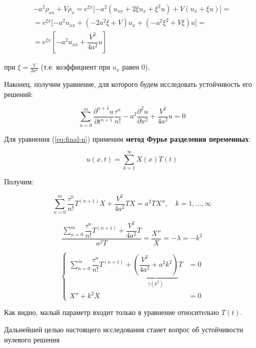 \begin{align}
- a^2 \rho_{xx} + V \rho_x = e^{\xi x} \lbrack -a^2 (u_{xx} + 2 \xi u_x + \xi^2 u) + V (u_x + \xi u) \rbrack = \\
= e^{\xi x} \lbrack -a^2 u_{xx} + (-2 a^2 \xi + V) u_x + (-a^2 \xi^2 + V \xi) u \rbrack = \\
= e^{\xi x} \left\lbrack -a^2 u_{xx} + \dfrac{V^2}{4a^2} u \right\rbrack
\end{align}

при $\xi = \frac{V}{2a^2}$ (т.е. коэффициент при $u_x$ равен $0$).

Наконец, получим уравнение, для которого будем исследовать устойчивость его решений:

\begin{equation}\label{eq:final-n}
\sum\limits_{n=0}^{m} \dfrac{\partial^{n+1} u}{\partial t^{n+1}} \dfrac{\tau^n}{n!} - a^2 \dfrac{\partial^2 u}{\partial x^2} + \dfrac{V^2}{4a^2} u = 0
\end{equation}

Для уравнения (\ref{eq:final-n}) применим \textbf{метод Фурье разделения переменных}:

\begin{equation}
u(x,t) = \sum\limits_{k=1}^{\infty} X(x)T(t)
\end{equation}

Получим:

\begin{equation}
\sum\limits_{n=0}^{m} \dfrac{\tau^n}{n!} T^{(n+1)} X + \dfrac{V^2}{4a^2} T X =a^2 T X'', \quad k=1,\dots,\infty
\end{equation}

\begin{equation}
\dfrac{\sum\limits_{n=0}^{m} \dfrac{\tau^n}{n!} T^{(n+1)} + \dfrac{V^2}{4a^2} T}{a^2 T} = \dfrac{X''}{X} = -\lambda = -k^2
\end{equation}

\begin{equation}
\left\{
\begin{aligned}
\sum\limits_{n=0}^{m} \dfrac{\tau^n}{n!} T^{(n+1)} + \underbrace{ \left( \dfrac{V^2}{4a^2} + a^2 k^2 \right)}_{\gamma(k^2)} T & = 0\\
X'' + k^2 X & = 0
\end{aligned}
\right.
\end{equation}

Как видно, малый параметр входит только в уравнение относительно $T(t)$.

Дальнейшей целью настоящего исследования станет вопрос об устойчивости нулевого решения

